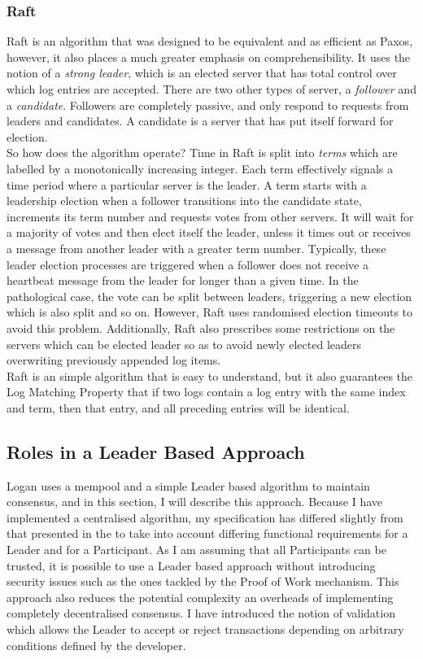 \documentclass[12pt,a4paper,twoside,openright]{report}
\begin{document}
	\subsubsection*{Raft}
	Raft \cite{Raft} is an algorithm that was designed to be equivalent and as efficient as Paxos, however, it also places a much greater emphasis on comprehensibility.
	It uses the notion of a \textit{strong leader}, which is an elected server that has total control over which log entries are accepted.
	There are two other types of server, a \textit{follower} and a \textit{candidate}. 
	Followers are completely passive, and only respond to requests from leaders and candidates. 
	A candidate is a server that has put itself forward for election.\\

	So how does the algorithm operate? 
	Time in Raft is split into \textit{terms} which are labelled by a monotonically increasing integer. 
	Each term effectively signals a time period where a particular server is the leader. 
	A term starts with a leadership election when a follower transitions into the candidate state, increments its term number and requests votes from other servers. 
	It will wait for a majority of votes and then elect itself the leader, unless it times out or receives a message from another leader with a greater term number. 
	Typically, these leader election processes are triggered when a follower does not receive a heartbeat message from the leader for longer than a given time.
	In the pathological case, the vote can be split between leaders, triggering a new election which is also split and so on.
	However, Raft uses randomised election timeouts to avoid this problem.
	Additionally, Raft also prescribes some restrictions on the servers which can be elected leader so as to avoid newly elected leaders overwriting previously appended log items.\\
	
	Raft is an simple algorithm that is easy to understand, but it also guarantees the Log Matching Property that if two logs contain a log entry with the same index and term, then that entry, and all preceding entries will be identical.

	\subsection{Roles in a Leader Based Approach}
	Logan uses a mempool and a simple Leader based algorithm to maintain consensus, and in this section, I will describe this approach.
	Because I have implemented a centralised algorithm, my specification has differed slightly from that presented in the  to take into account differing functional requirements for a Leader and for a Participant.
	As I am assuming that all Participants can be trusted, it is possible to use a Leader based approach without introducing security issues such as the ones tackled by the Proof of Work mechanism. 
	This approach also reduces the potential complexity an overheads of implementing completely decentralised consensus.
	I have introduced the notion of validation which allows the Leader to accept or reject transactions depending on arbitrary conditions defined by the developer.
	
\end{document}
